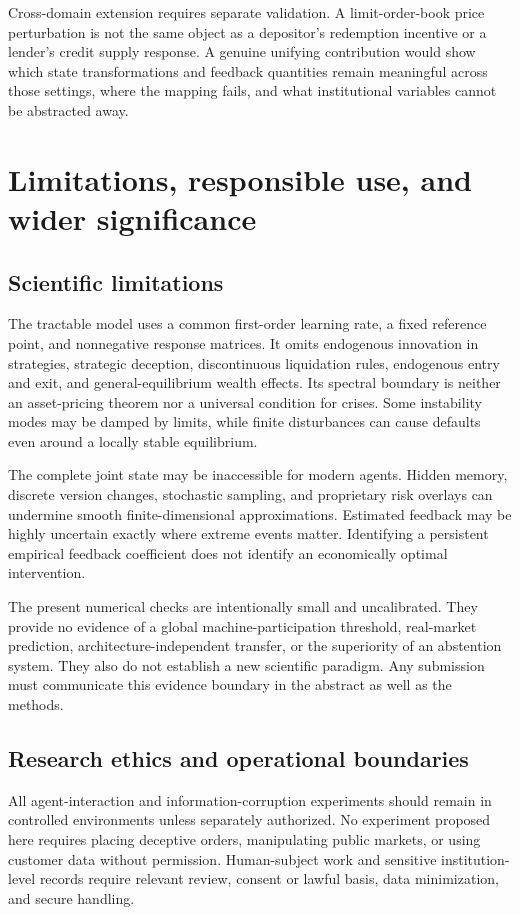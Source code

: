 \documentclass[11pt,a4paper]{article}
\theoremstyle{definition}
\theoremstyle{remark}
\begin{document}
Cross-domain extension requires separate validation. A limit-order-book price perturbation is not the same object as a depositor's redemption incentive or a lender's credit supply response. A genuine unifying contribution would show which state transformations and feedback quantities remain meaningful across those settings, where the mapping fails, and what institutional variables cannot be abstracted away.

\section{Limitations, responsible use, and wider significance}
\label{sec:limits}
\subsection{Scientific limitations}
The tractable model uses a common first-order learning rate, a fixed reference point, and nonnegative response matrices. It omits endogenous innovation in strategies, strategic deception, discontinuous liquidation rules, endogenous entry and exit, and general-equilibrium wealth effects. Its spectral boundary is neither an asset-pricing theorem nor a universal condition for crises. Some instability modes may be damped by limits, while finite disturbances can cause defaults even around a locally stable equilibrium.

The complete joint state may be inaccessible for modern agents. Hidden memory, discrete version changes, stochastic sampling, and proprietary risk overlays can undermine smooth finite-dimensional approximations. Estimated feedback may be highly uncertain exactly where extreme events matter. Identifying a persistent empirical feedback coefficient does not identify an economically optimal intervention.

The present numerical checks are intentionally small and uncalibrated. They provide no evidence of a global machine-participation threshold, real-market prediction, architecture-independent transfer, or the superiority of an abstention system. They also do not establish a new scientific paradigm. Any submission must communicate this evidence boundary in the abstract as well as the methods.

\subsection{Research ethics and operational boundaries}
All agent-interaction and information-corruption experiments should remain in controlled environments unless separately authorized. No experiment proposed here requires placing deceptive orders, manipulating public markets, or using customer data without permission. Human-subject work and sensitive institution-level records require relevant review, consent or lawful basis, data minimization, and secure handling.
\end{document}
